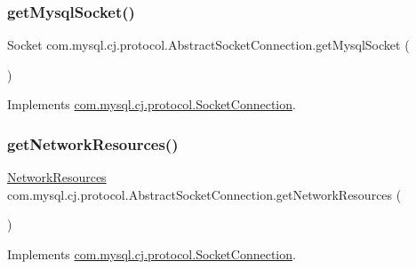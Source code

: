 \subsubsection{\texorpdfstring{get\+Mysql\+Socket()}{getMysqlSocket()}}
{\footnotesize\ttfamily Socket com.\+mysql.\+cj.\+protocol.\+Abstract\+Socket\+Connection.\+get\+Mysql\+Socket (\begin{DoxyParamCaption}{ }\end{DoxyParamCaption})}



Implements \mbox{\hyperlink{interfacecom_1_1mysql_1_1cj_1_1protocol_1_1_socket_connection_a121c70b73c6aed15d44533af8194ba8c}{com.\+mysql.\+cj.\+protocol.\+Socket\+Connection}}.

\mbox{\label{classcom_1_1mysql_1_1cj_1_1protocol_1_1_abstract_socket_connection_a4352de9fb88c8ee51a26347fb3d680ec}} 
\subsubsection{\texorpdfstring{get\+Network\+Resources()}{getNetworkResources()}}
{\footnotesize\ttfamily \mbox{\hyperlink{classcom_1_1mysql_1_1cj_1_1protocol_1_1_network_resources}{Network\+Resources}} com.\+mysql.\+cj.\+protocol.\+Abstract\+Socket\+Connection.\+get\+Network\+Resources (\begin{DoxyParamCaption}{ }\end{DoxyParamCaption})}



Implements \mbox{\hyperlink{interfacecom_1_1mysql_1_1cj_1_1protocol_1_1_socket_connection_aaf05ea68f2fb6c8c192ee8ec8f8faf91}{com.\+mysql.\+cj.\+protocol.\+Socket\+Connection}}.

\mbox{\label{classcom_1_1mysql_1_1cj_1_1protocol_1_1_abstract_socket_connection_aab3a20dd6812f375dfa5050f8c056384}} 
